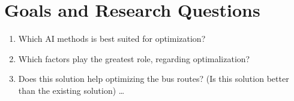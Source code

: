 \section{Goals and Research Questions}

\begin{enumerate}
  \item Which AI methods is best suited for optimization?
  \item Which factors play the greatest role, regarding optimalization?
  \item Does this solution help optimizing the bus routes? (Is this solution better than the existing solution)
   \ldots
\end{enumerate}